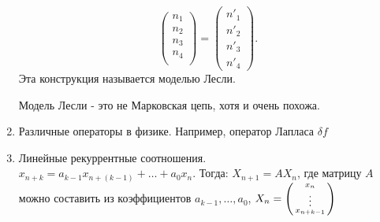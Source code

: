 \begin{examples}
\begin{enumerate}
\[            \begin{pmatrix}
                n_1\\
                n_2\\
                n_3\\
                n_4\\
            \end{pmatrix}
             =
             \begin{pmatrix}
                 n'_1\\
                 n'_2\\
                 n'_3\\
                 n'_4
             \end{pmatrix}
            .\] 
            Эта конструкция называется моделью Лесли.
            \begin{remark}
                Модель Лесли - это не Марковская цепь, хотя и очень похожа.
            \end{remark}
        \item
            Различные операторы в физике. Например, оператор Лапласа $\delta f$
        \item
            Линейные рекуррентные соотношения.\\
            $x_{n + k} = a_{k-1}x_{n + (k - 1)} + \dots + a_0x_n$.
            Тогда:
            $X_{n + 1} = AX_n$, где матрицу $A$ можно составить из коэффициентов $a_{k - 1}, \dots, a_0$, 
            $X_n = \begin{psmallmatrix}
                x_n \\ \vdots \\ x_{n + k - 1}
            \end{psmallmatrix}$
    \end{enumerate}
\end{examples}
